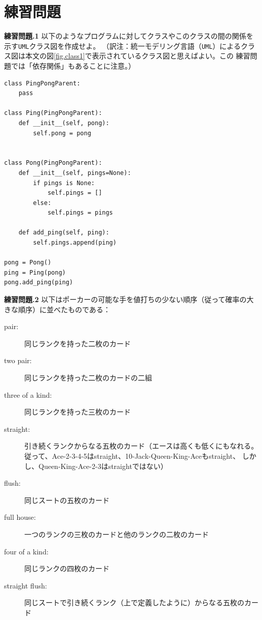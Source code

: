 \documentclass[a4j,12pt,makeidx]{jbook}
\newcommand{\tp}{\thechapter}
\begin{document}
\section{練習問題}

\noindent
{\bf 練習問題\tp.1} 以下のようなプログラムに対してクラスやこのクラスの間の関係を示す{\tt UML}クラス図を作成せよ。
（訳注：統一モデリング言語（{\tt UML}）によるクラス図は本文の図\ref{fig.class1}で表示されているクラス図と思えばよい。この
練習問題では「依存関係」もあることに注意。）

\begin{verbatim}
class PingPongParent:
    pass

class Ping(PingPongParent):
    def __init__(self, pong):
        self.pong = pong


class Pong(PingPongParent):
    def __init__(self, pings=None):
        if pings is None:
            self.pings = []
        else:
            self.pings = pings

    def add_ping(self, ping):
        self.pings.append(ping)

pong = Pong()
ping = Ping(pong)
pong.add_ping(ping)
\end{verbatim} \par

\noindent
{\bf 練習問題\tp.2} 以下はポーカーの可能な手を値打ちの少ない順序（従って確率の大きな順序）に並べたものである：
\begin{description}

\item[pair:] 同じランクを持った二枚のカード
\vspace{-0.05in}

\item[two pair:] 同じランクを持った二枚のカードの二組
\vspace{-0.05in}

\item[three of a kind:] 同じランクを持った三枚のカード
\vspace{-0.05in}

\item[straight:] 引き続くランクからなる五枚のカード（エースは高くも低くにもなれる。
従って、Ace-2-3-4-5はstraight、10-Jack-Queen-King-Aceもstraight、
しかし、Queen-King-Ace-2-3はstraightではない）
\vspace{-0.05in}

\item[flush:] 同じスートの五枚のカード
\vspace{-0.05in}

\item[full house:] 一つのランクの三枚のカードと他のランクの二枚のカード
\vspace{-0.05in}

\item[four of a kind:] 同じランクの四枚のカード
\vspace{-0.05in}

\item[straight flush:] 同じスートで引き続くランク（上で定義したように）からなる五枚のカード
\vspace{-0.05in}

\end{description}
\end{document}
